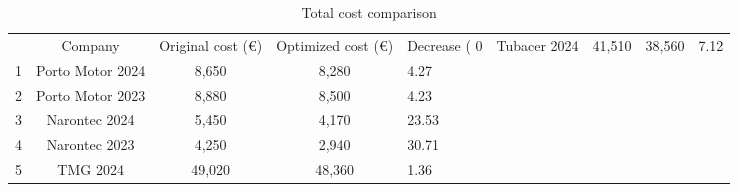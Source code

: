 \begin{table}[center]
\caption{Total cost comparison}
\begin{tabular}{|c|c|c|c|}
 & Company & Original cost (€) & Optimized cost (€) & Decrease (%
0 & Tubacer 2024 & 41,510 & 38,560 & 7.12 \\
1 & Porto Motor 2024 & 8,650 & 8,280 & 4.27 \\
2 & Porto Motor 2023 & 8,880 & 8,500 & 4.23 \\
3 & Narontec 2024 & 5,450 & 4,170 & 23.53 \\
4 & Narontec 2023 & 4,250 & 2,940 & 30.71 \\
5 & TMG 2024 & 49,020 & 48,360 & 1.36 \\
\end{tabular}
\end{table}
